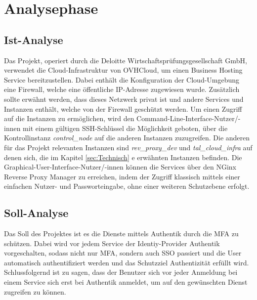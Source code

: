\section{Analysephase} 
\label{sec:Analysephase}


\subsection{Ist-Analyse} 
\label{sec:IstAnalyse}
Das Projekt, operiert durch die Deloitte Wirtschaftsprüfungsgesellschaft GmbH, verwendet die Cloud-Infrastruktur 
von OVHCloud, um einen Business Hosting Service bereitzustellen. Dabei enthält die Konfiguration der 
Cloud-Umgebung eine Firewall, welche eine öffentliche IP-Adresse zugewiesen wurde. Zusätzlich sollte erwähnt werden, 
dass dieses Netzwerk privat ist und andere Services und Instanzen enthält, welche von der Firewall geschützt werden.
Um einen Zugriff auf die Instanzen zu ermöglichen, wird den Command-Line-Interface-Nutzer/-innen mit einem gültigen
SSH-Schlüssel die Möglichkeit geboten, über die Kontrollinstanz \textit{control\_node} auf die anderen Instanzen 
zuzugreifen. Die anderen für das Projekt relevanten Instanzen sind \textit{rev\_proxy\_dev} und \textit{tal\_cloud\_infra} 
auf denen sich, die im Kapitel \ref*{sec:Technisch} e  
erwähnten Instanzen befinden. Die Graphical-User-Interface-Nutzer/-innen können die Services über den NGinx Reverse Proxy Manager 
zu erreichen, indem der Zugriff klassisch mittels einer einfachen Nutzer- und Passworteingabe, ohne einer weiteren 
Schutzebene erfolgt.

\subsection{Soll-Analyse}
\label{sec:SollAnalyse}
Das Soll des Projektes ist es die Dienste mittels Authentik durch die \acs*{MFA} zu schützen. Dabei wird vor jedem Service 
der Identiy-Provider Authentik vorgeschalten, sodass nicht nur \acs*{MFA}, sondern auch \acs*{SSO} passiert und die User automatisch 
authentifiziert werden und das Schutzziel Authentizität erfüllt wird.
\\Schlussfolgernd ist zu sagen, dass der Benutzer sich vor jeder Anmeldung bei einem Service sich erst bei Authentik 
anmeldet, um auf den gewünschten Dienst zugreifen zu können.



